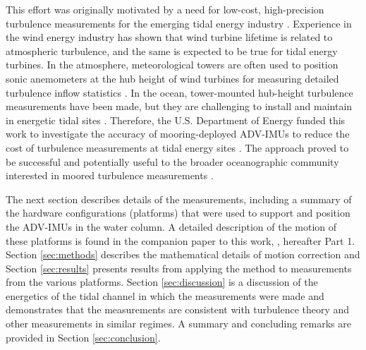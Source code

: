 This effort was originally motivated by a need for low-cost, high-precision turbulence measurements for the emerging tidal energy industry \cite[]{Mccaffrey++2015, Alexander+Hamlington2015}. Experience in the wind energy industry has shown that wind turbine lifetime is related to atmospheric turbulence, and the same is expected to be true for tidal energy turbines. In the atmosphere, meteorological towers are often used to position sonic anemometers at the hub height of wind turbines for measuring detailed turbulence inflow statistics \cite[]{Hand++2003, Kelley++2005, Mucke++2011, Afgan++2013}. In the ocean, tower-mounted hub-height turbulence measurements have been made, but they are challenging to install and maintain in energetic tidal sites \cite[]{Gunawan++2014,Thomson++2012}. Therefore, the U.S. Department of Energy funded this work to investigate the accuracy of mooring-deployed ADV-IMUs to reduce the cost of turbulence measurements at tidal energy sites \cite[]{Kilcher++2016}. The approach proved to be successful and potentially useful to the broader oceanographic community interested in moored turbulence measurements \cite[]{Lueck+Huang1999, Doherty++1999, Nash++2004, Perlin+Moum2012, Alford2010, Paskyabi+Fer2013}.

The next section describes details of the measurements, including a summary of the hardware configurations (platforms) that were used to support and position the ADV-IMUs in the water column. A detailed description of the motion of these platforms is found in the companion paper to this work, \cite{Harding++2017}, hereafter Part 1. Section \ref{sec:methods} describes the mathematical details of motion correction and Section \ref{sec:results} presents results from applying the method to measurements from the various platforms. Section \ref{sec:discussion} is a discussion of the energetics of the tidal channel in which the measurements were made and demonstrates that the measurements are consistent with turbulence theory and other measurements in similar regimes. A summary and concluding remarks are provided in Section \ref{sec:conclusion}.


